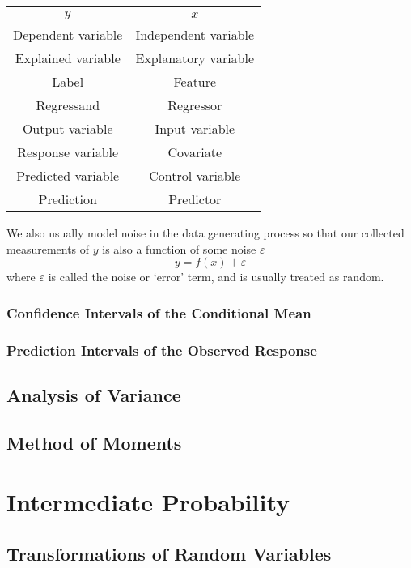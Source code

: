 \documentclass[11pt]{report} %
\begin{document}
\begin{table}[H]\centering
\begin{tabular}{|c|c|}
\hline 
$y$ & $x$ \\
\hline 
\hline 
Dependent variable & Independent variable \\
Explained variable & Explanatory variable \\
Label & Feature \\
Regressand & Regressor \\
Output variable & Input variable \\
Response variable & Covariate \\
Predicted variable & Control variable \\
Prediction & Predictor \\
\hline
\end{tabular}
\end{table}
We also usually model noise in the data generating process so that our collected measurements of $y$ is also a function of some noise $\varepsilon$
\begin{equation}
y = f\left(x\right) + \varepsilon
\end{equation}
where $\varepsilon$ is called the noise or `error' term, and is usually treated as random.

\subsection{Confidence Intervals of the Conditional Mean}

\subsection{Prediction Intervals of the Observed Response}

\section{Analysis of Variance}

\section{Method of Moments}

\chapter{Intermediate Probability}

\section{Transformations of Random Variables}
\end{document}
